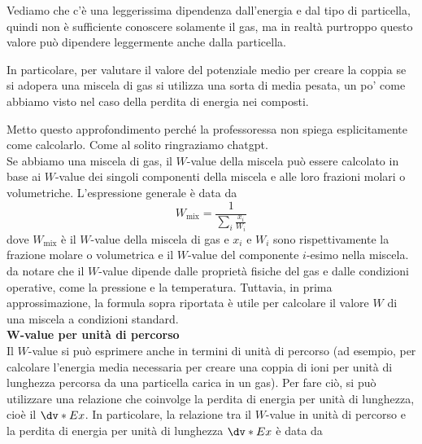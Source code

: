 Vediamo che c'è una leggerissima dipendenza dall'energia e dal tipo di particella, quindi non è sufficiente conoscere solamente il gas, ma in realtà purtroppo questo valore può dipendere leggermente anche dalla particella.

In particolare, per valutare il valore del potenziale medio per creare la coppia se si adopera una miscela di gas si utilizza una sorta di media pesata, un po' come abbiamo visto nel caso della perdita di energia nei composti.

\begin{approfondimento}
   \footnotesize
   Metto questo approfondimento perché la professoressa non spiega esplicitamente come calcolarlo. Come al solito ringraziamo chatgpt.\\[0.2cm]
   Se abbiamo una miscela di gas, il $W$-value della miscela può essere calcolato in base ai $W$-value dei singoli componenti della miscela e alle loro frazioni molari o volumetriche. L'espressione generale è data da
   \begin{equation*}
      W_{\text{mix}} = \frac{1}{\sum_i \frac{x_i}{W_i}}
   \end{equation*}
   dove $W_{\text{mix}}$ è il $W$-value della miscela di gas e $x_i$ e $W_i$ sono rispettivamente la frazione molare o volumetrica e il $W$-value del componente $i$-esimo nella miscela.\\
   \E da notare che il $W$-value dipende dalle proprietà fisiche del gas e dalle condizioni operative, come la pressione e la temperatura. Tuttavia, in prima approssimazione, la formula sopra riportata è utile per calcolare il valore $W$ di una miscela a condizioni standard.\\[0.2cm]
   \textbf{$\boldsymbol{W}$-value per unità di percorso}\\
   Il $W$-value si può esprimere anche in termini di unità di percorso (ad esempio, per calcolare l'energia media necessaria per creare una coppia di ioni per unità di lunghezza percorsa da una particella carica in un gas). Per fare ciò, si può utilizzare una relazione che coinvolge la perdita di energia per unità di lunghezza, cioè il $\dv*{E}{x}$. In particolare, la relazione tra il $W$-value in unità di percorso e la perdita di energia per unità di lunghezza $\dv*{E}{x}$ è data da

\end{approfondimento}
